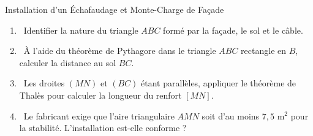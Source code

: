 \begin{sujetdnb}{Installation d'un Échafaudage et Monte-Charge de Façade}
\begin{enumerate}[leftmargin=1.5em, itemsep=3pt]
    \item \capSApproprier\ Identifier la nature du triangle $ABC$ formé par la façade, le sol et le câble.
    \item \capRealiser\ À l'aide du théorème de Pythagore dans le triangle $ABC$ rectangle en $B$, calculer la distance au sol $BC$.
    \item \capRealiser\ Les droites $(MN)$ et $(BC)$ étant parallèles, appliquer le théorème de Thalès pour calculer la longueur du renfort $[MN]$.
    \item \capValider\ Le fabricant exige que l'aire triangulaire $AMN$ soit d'au moins \textbf{$7{,}5\text{ m}^2$} pour la stabilité. L'installation est-elle conforme ?
\end{enumerate}

\vspace{3mm}
\lignesreponse[8]
\end{sujetdnb}
